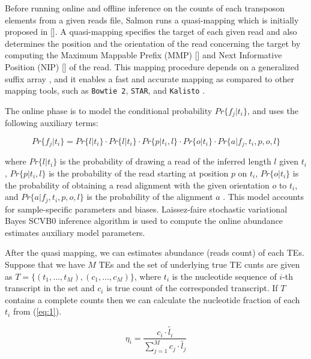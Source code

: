 \documentclass{ws-procs11x85}
\begin{document}
Before running online and offline inference on the counts of each transposon elements from a given reads file,
Salmon runs a quasi-mapping which is initially proposed in []. A quasi-mapping specifies the target of each given read and also determines the position and the orientation of the read concerning the target by computing the
Maximum Mappable Prefix (MMP) [] and Next Informative Position (NIP) [] of the read.
This mapping procedure depends on a generalized suffix array \cite{manber1993suffix}, 
and it enables a fast and accurate mapping as compared to other mapping tools, such as \verb|Bowtie 2|, \verb|STAR|, and \verb|Kalisto| \cite{srivastava2016rapmap}. 

The online phase is to model the conditional probability $Pr \{f_j | t_i \}$, and
uses the following auxiliary terms:

\begin{equation}
Pr \{f_j | t_i \} = Pr \{ l | t_i \} 
\cdot Pr \{ l | t_i \} 
\cdot Pr \{ p | t_i, l \} 
\cdot Pr \{ o | t_i \} 
\cdot Pr \{ a | f_j, t_i, p, o, l \} 
\end{equation}

where $Pr \{ l | t_i \}$ 
is the probability of drawing a read of the inferred length $l$ given $t_i$,  
$Pr \{ p | t_i, l \}$ is the probability of the read starting at position $p$ on $t_i$,
$Pr \{ o | t_i \}$ is the probability of obtaining a read
alignment with the given orientation $o$ to $t_i$, and
$Pr \{ a | f_j, t_i, p, o, l \} $ is the probability of the alignment $a$ \cite{patro2017salmon}. 
This model accounts for sample-specific parameters and biases.
Laissez-faire stochastic variational Bayes SCVB0 inference algorithm is used to 
compute the online abundance estimates auxiliary model parameters\cite{patro2017salmon}.

After the quasi mapping, 
we can estimates abundance (reads count) of each TEs. 
Suppose that
we have $M$ TEs and the set of underlying true TE cunts are given as
$T = \{(t_1, \dots , t_M), (c_1, \dots, c_M) \}$, where $t_i$ is the nucleotide sequence of $i$-th transcript in the set and $c_i$ is true count of the corresponded transcript. 
If $T$ contains a complete counts then we can calculate the nucleotide fraction \cite{li2009rna} of each $t_i$ from (\ref{eq:1}).
 

\begin{equation} \label{eq:1}
\eta_i = \frac{c_i \cdot \widetilde{l_i} }{\sum_{j=1}^{M} c_j \cdot \widetilde{l_j}}
\end{equation}
\end{document}
